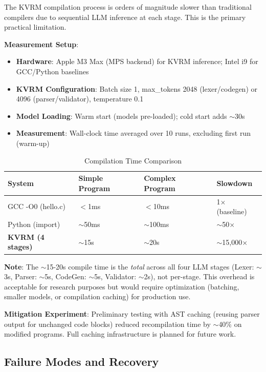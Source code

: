 \documentclass[11pt,a4paper]{article}
\begin{document}
The KVRM compilation process is orders of magnitude slower than traditional compilers due to sequential LLM inference at each stage. This is the primary practical limitation.

\textbf{Measurement Setup}:
\begin{itemize}
    \item \textbf{Hardware}: Apple M3 Max (MPS backend) for KVRM inference; Intel i9 for GCC/Python baselines
    \item \textbf{KVRM Configuration}: Batch size 1, max\_tokens 2048 (lexer/codegen) or 4096 (parser/validator), temperature 0.1
    \item \textbf{Model Loading}: Warm start (models pre-loaded); cold start adds $\sim$30s
    \item \textbf{Measurement}: Wall-clock time averaged over 10 runs, excluding first run (warm-up)
\end{itemize}

\begin{table}[H]
\centering
\caption{Compilation Time Comparison}
\label{tab:compile-compare}
\begin{tabular}{@{}llll@{}}
\toprule
\textbf{System} & \textbf{Simple Program} & \textbf{Complex Program} & \textbf{Slowdown} \\
\midrule
GCC -O0 (hello.c) & $<$1ms & $<$10ms & 1$\times$ (baseline) \\
Python (import) & $\sim$50ms & $\sim$100ms & $\sim$50$\times$ \\
\textbf{KVRM (4 stages)} & $\sim$15s & $\sim$20s & $\sim$15,000$\times$ \\
\bottomrule
\end{tabular}
\end{table}

\textbf{Note}: The $\sim$15-20s compile time is the \textit{total} across all four LLM stages (Lexer: $\sim$3s, Parser: $\sim$5s, CodeGen: $\sim$5s, Validator: $\sim$2s), not per-stage. This overhead is acceptable for research purposes but would require optimization (batching, smaller models, or compilation caching) for production use.

\textbf{Mitigation Experiment}: Preliminary testing with AST caching (reusing parser output for unchanged code blocks) reduced recompilation time by $\sim$40\% on modified programs. Full caching infrastructure is planned for future work.

\subsection{Failure Modes and Recovery}
\end{document}

